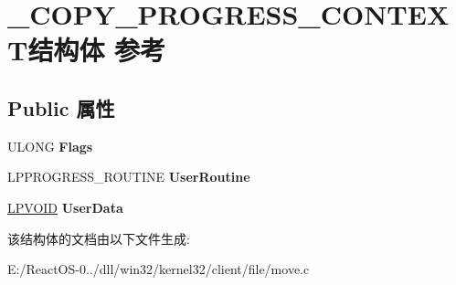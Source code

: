 \hypertarget{struct___c_o_p_y___p_r_o_g_r_e_s_s___c_o_n_t_e_x_t}{}\section{\+\_\+\+C\+O\+P\+Y\+\_\+\+P\+R\+O\+G\+R\+E\+S\+S\+\_\+\+C\+O\+N\+T\+E\+X\+T结构体 参考}
\label{struct___c_o_p_y___p_r_o_g_r_e_s_s___c_o_n_t_e_x_t}
\subsection*{Public 属性}
\begin{DoxyCompactItemize}
\item 
\mbox{\label{struct___c_o_p_y___p_r_o_g_r_e_s_s___c_o_n_t_e_x_t_aa4ff647b738886fc5596d170d8b2f538}} 
U\+L\+O\+NG {\bfseries Flags}
\item 
\mbox{\label{struct___c_o_p_y___p_r_o_g_r_e_s_s___c_o_n_t_e_x_t_aaeeb5e9ee4fb08543aa4eed205d6602e}} 
L\+P\+P\+R\+O\+G\+R\+E\+S\+S\+\_\+\+R\+O\+U\+T\+I\+NE {\bfseries User\+Routine}
\item 
\mbox{\label{struct___c_o_p_y___p_r_o_g_r_e_s_s___c_o_n_t_e_x_t_a9c763917352f1beb1c838d88abf2a0af}} 
\hyperlink{interfacevoid}{L\+P\+V\+O\+ID} {\bfseries User\+Data}
\end{DoxyCompactItemize}


该结构体的文档由以下文件生成\+:\begin{DoxyCompactItemize}
\item 
E\+:/\+React\+O\+S-\/0../dll/win32/kernel32/client/file/move.\+c\end{DoxyCompactItemize}

